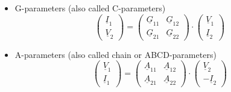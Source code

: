\begin{itemize}
\item G-parameters (also called C-parameters)
\begin{equation}
\begin{pmatrix}
\underline{I}_{1}\\
\underline{V}_{2}
\end{pmatrix}
=
\begin{pmatrix}
\underline{G}_{11} & \underline{G}_{12}\\
\underline{G}_{21} & \underline{G}_{22}
\end{pmatrix}
\cdot
\begin{pmatrix}
\underline{V}_{1}\\
\underline{I}_{2}
\end{pmatrix}
\end{equation}

\item A-parameters (also called chain or ABCD-parameters)
\begin{equation}
\begin{pmatrix}
\underline{V}_{1}\\
\underline{I}_{1}
\end{pmatrix}
=
\begin{pmatrix}
\underline{A}_{11} & \underline{A}_{12}\\
\underline{A}_{21} & \underline{A}_{22}
\end{pmatrix}
\cdot
\begin{pmatrix}
\underline{V}_{2}\\
-\underline{I}_{2}
\end{pmatrix}
\end{equation}

\end{itemize}

